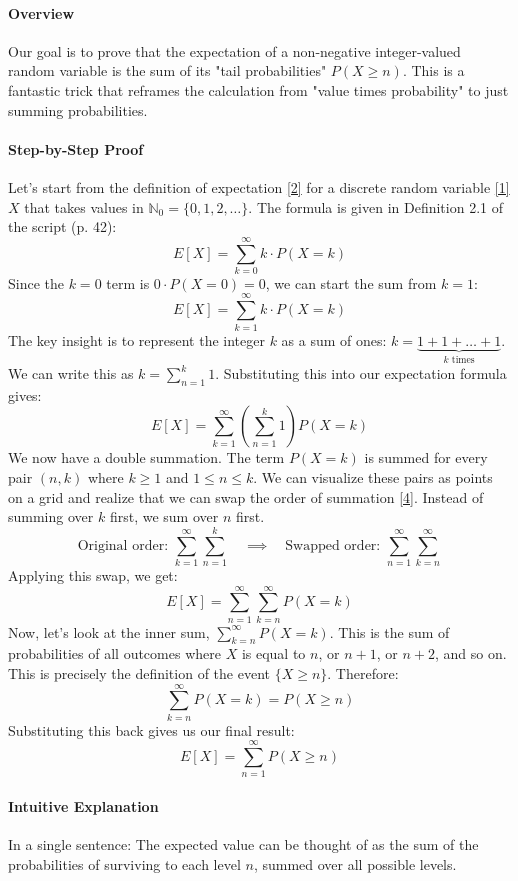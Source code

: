 \documentclass[11pt,a4paper]{article}
\begin{document}
\paragraph{Overview}
Our goal is to prove that the expectation of a non-negative integer-valued random variable is the sum of its "tail probabilities" $P(X \ge n)$. This is a fantastic trick that reframes the calculation from "value times probability" to just summing probabilities.

\paragraph{Step-by-Step Proof}
Let's start from the definition of expectation \hyperlink{note_expectation}{[2]} for a discrete random variable \hyperlink{note_rv}{[1]} $X$ that takes values in $\mathbb{N}_0 = \{0, 1, 2, \dots\}$.
The formula is given in Definition 2.1 of the script (p. 42):
\[
    E[X] = \sum_{k=0}^{\infty} k \cdot P(X=k)
\]
Since the $k=0$ term is $0 \cdot P(X=0) = 0$, we can start the sum from $k=1$:
\[
    E[X] = \sum_{k=1}^{\infty} k \cdot P(X=k)
\]
The key insight is to represent the integer $k$ as a sum of ones: $k = \underbrace{1 + 1 + \dots + 1}_{k \text{ times}}$. We can write this as $k = \sum_{n=1}^{k} 1$. Substituting this into our expectation formula gives:
\[
    E[X] = \sum_{k=1}^{\infty} \left( \sum_{n=1}^{k} 1 \right) P(X=k)
\]
We now have a double summation. The term $P(X=k)$ is summed for every pair $(n,k)$ where $k \ge 1$ and $1 \le n \le k$. We can visualize these pairs as points on a grid and realize that we can swap the order of summation \hyperlink{note_fubini}{[4]}. Instead of summing over $k$ first, we sum over $n$ first.
\[
    \text{Original order: } \sum_{k=1}^{\infty} \sum_{n=1}^{k} \quad \implies \quad \text{Swapped order: } \sum_{n=1}^{\infty} \sum_{k=n}^{\infty}
\]
Applying this swap, we get:
\[
    E[X] = \sum_{n=1}^{\infty} \sum_{k=n}^{\infty} P(X=k)
\]
Now, let's look at the inner sum, $\sum_{k=n}^{\infty} P(X=k)$. This is the sum of probabilities of all outcomes where $X$ is equal to $n$, or $n+1$, or $n+2$, and so on. This is precisely the definition of the event $\{X \ge n\}$. Therefore:
\[
    \sum_{k=n}^{\infty} P(X=k) = P(X \ge n)
\]
Substituting this back gives us our final result:
\[
    \boxed{E[X] = \sum_{n=1}^{\infty} P(X \ge n)}
\]
\paragraph{Intuitive Explanation}
In a single sentence: The expected value can be thought of as the sum of the probabilities of surviving to each level $n$, summed over all possible levels.
\end{document}
